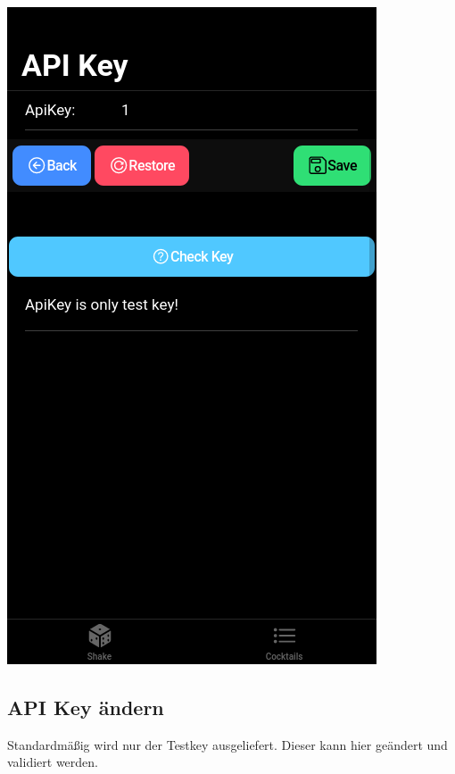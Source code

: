\documentclass[a4paper, 10pt]{article}
\begin{document}
\begin{multicols}{4}
    \begin{center}
        \includegraphics[width=.8\linewidth]{ApiKey.png}
    \end{center}
    \columnbreak
    \subsection{API Key ändern}
    Standardmäßig wird nur der Testkey ausgeliefert. Dieser kann hier geändert und validiert werden.
\end{multicols}
\end{document}
